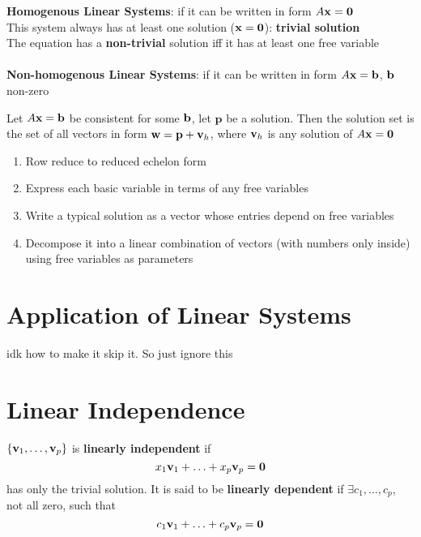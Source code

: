 \documentclass{report}
\begin{document}
\textbf{Homogenous Linear Systems}: if it can be written in form $A \mathbf{x} = \mathbf{0}$
\\This system always has at least one solution ($\mathbf{x} = \mathbf{0}$): \textbf{trivial solution}
\\The equation has a \textbf{non-trivial} solution iff it has at least one free variable
\\\\\textbf{Non-homogenous Linear Systems}: if it can be written in form $A \mathbf{x} = \mathbf{b}$, 
$\mathbf{b}$ non-zero

\begin{theorem}
\end{theorem}
Let $A \mathbf{x} = \mathbf{b}$ be consistent for some $\mathbf{b}$, let $\mathbf{p}$ be a solution.
Then the solution set is the set of all vectors in form $\mathbf{w} = \mathbf{p} + \mathbf{v}_h$, 
where $\mathbf{v}_h$ is any solution of $A \mathbf{x} = \mathbf{0}$

\begin{tcolorbox}[colback=blue!5!white, colframe=blue!75!black, title=Writing a solution set in parametric vector form]
\begin{enumerate}
    \item Row reduce to reduced echelon form
    \item Express each basic variable in terms of any free variables
    \item Write a typical solution as a vector whose entries depend on free variables
    \item Decompose it into a linear combination of vectors (with numbers only inside) using free variables as parameters
\end{enumerate}
\end{tcolorbox}

\section{Application of Linear Systems} idk how to make it skip it. So just ignore this
\section{Linear Independence}
\begin{definition}
\end{definition}
$\{ \mathbf{v}_1, \ldots, \mathbf{v}_p\}$ is \textbf{linearly independent} if 
\[
x_1 \mathbf{v}_1 + \ldots + x_p \mathbf{v}_p = \mathbf{0}
\]
has only the trivial solution. It is said to be \textbf{linearly dependent} if $\exists c_1, \ldots, c_p$, not all zero, such that 
\[
c_1 \mathbf{v}_1 + \ldots + c_p \mathbf{v}_p = \mathbf{0}
\]
\end{document}
